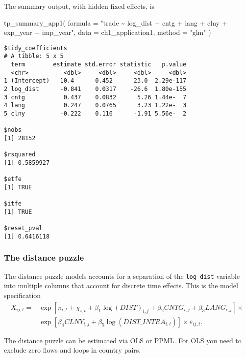 \documentclass[12pt,reqno,oneside,pdftex]{formato-puc/puctesis} %
\newenvironment{Shaded}{\begin{snugshade}}{\end{snugshade}}
\newcommand{\AttributeTok}[1]{\textcolor[rgb]{0.77,0.63,0.00}{#1}}
\newcommand{\FunctionTok}[1]{\textcolor[rgb]{0.00,0.00,0.00}{#1}}
\newcommand{\NormalTok}[1]{#1}
\newcommand{\StringTok}[1]{\textcolor[rgb]{0.31,0.60,0.02}{#1}}
\begin{document}
The summary output, with hidden fixed effects, is

\begin{Shaded}
\begin{Highlighting}[]
\FunctionTok{tp\_summary\_app1}\NormalTok{(}
  \AttributeTok{formula =} \StringTok{"trade \textasciitilde{} log\_dist + cntg + lang + clny + exp\_year + imp\_year"}\NormalTok{,}
  \AttributeTok{data =}\NormalTok{ ch1\_application1,}
  \AttributeTok{method =} \StringTok{"glm"}
\NormalTok{)}
\end{Highlighting}
\end{Shaded}

\begin{verbatim}
$tidy_coefficients
# A tibble: 5 x 5
  term        estimate std.error statistic   p.value
  <chr>          <dbl>     <dbl>     <dbl>     <dbl>
1 (Intercept)   10.4      0.452      23.0  2.29e-117
2 log_dist      -0.841    0.0317    -26.6  1.80e-155
3 cntg           0.437    0.0832      5.26 1.44e-  7
4 lang           0.247    0.0765      3.23 1.22e-  3
5 clny          -0.222    0.116      -1.91 5.56e-  2

$nobs
[1] 28152

$rsquared
[1] 0.5859927

$etfe
[1] TRUE

$itfe
[1] TRUE

$reset_pval
[1] 0.6416118
\end{verbatim}

\hypertarget{the-distance-puzzle}{%
\subsubsection{The distance puzzle}\label{the-distance-puzzle}}

The distance puzzle models accounts for a separation of the
\texttt{log\_dist} variable into multiple columns that account for
discrete time effects. This is the model specification \begin{align*}
X_{ij,t} =& \exp\left[\pi_{i,t} + \chi_{i,t} + \beta_1 \log(DIST)_{i,j} + \beta_2 CNTG_{i,j} + \beta_3 LANG_{i,j}\right]\times\\
\text{ }& \exp\left[\beta_4 CLNY_{i,j} + \beta_5 \log(DIST\_INTRA_{i,i})\right] \times \varepsilon_{ij,t}.
\end{align*}

The distance puzzle can be estimated via OLS or PPML. For OLS you need
to exclude zero flows and loops in country pairs.
\end{document}
